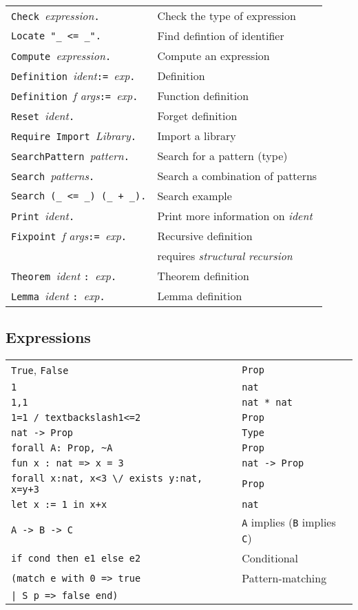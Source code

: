 \documentclass[10pt,landscape]{article}
\begin{document}
\begin{multicols}{3}
{\begin{tabular}{ll}
  {\tt Check }\emph{expression}{\tt .} & Check the type of expression \\
  {\tt Locate "\_ <= \_".} & Find defintion of identifier \\
  {\tt Compute }\emph{expression}{\tt .} & Compute an expression \\
  {\tt Definition }\emph{ident}{\tt := }\emph{exp}{\tt .} & Definition \\
  {\tt Definition }\emph{f args}{\tt := }\emph{exp}{\tt .} & Function definition \\
  {\tt Reset }\emph{ident}{\tt .} & Forget definition \\
  {\tt Require Import }\emph{Library}{\tt .} & Import a library\\
  {\tt SearchPattern }\emph{pattern}{\tt .} & Search for a pattern (type)\\
  {\tt Search }\emph{patterns}{\tt .} & Search a combination of patterns\\
  {\tt Search (\_ <= \_) (\_ + \_).} & Search example\\
  {\tt Print }\emph{ident}{\tt .} & Print more information on \emph{ident}\\
  {\tt Fixpoint }\emph{f args}{\tt := }\emph{exp}{\tt .} & Recursive definition \\
  & requires \emph{structural recursion}\\
  {\tt Theorem }\emph{ident }{\tt : }\emph{exp}{\tt .} & Theorem definition \\
  {\tt Lemma }\emph{ident }{\tt : }\emph{exp}{\tt .} & Lemma definition \\
\end{tabular}

\subsection{Expressions}
\hspace{-2em}
\begin{tabular}{ll}
  {\tt True}, {\tt False} & {\tt Prop} \\
  {\tt 1} & {\tt nat} \\
  {\tt 1,1} & {\tt nat * nat} \\
  {\tt 1=1 /\ textbackslash{}1<=2} & {\tt Prop} \\
  {\tt nat -> Prop} & {\tt Type} \\
  {\tt forall A: Prop, \textasciitilde{}A} & {\tt Prop}\\
  {\tt fun x : nat => x = 3} & {\tt nat -> Prop}\\
  {\tt forall x:nat, x<3 \textbackslash/ exists y:nat, x=y+3} & {\tt Prop}\\
  {\tt let x := 1 in x+x} & {\tt nat}\\
  {\tt A -> B -> C} & {\tt A} implies ({\tt B} implies {\tt C})\\
  {\tt if cond then e1 else e2} & Conditional \\
  {\tt (match e with 0 => true} & Pattern-matching\\
  {\tt | S p => false   end)} &\\
\end{tabular}

}
\end{multicols}
\end{document}
